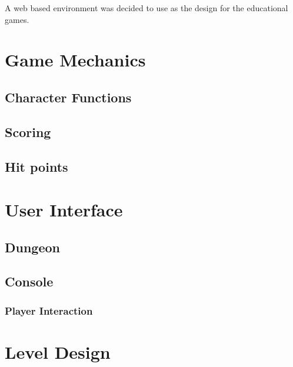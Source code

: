 \documentclass[a4paper,11.5pt]{report}
\numberwithin{figure}{section}
\numberwithin{table}{section}
\numberwithin{equation}{section}
\numberwithin{equation}{section}
\begin{document}

A web based environment was decided to use as the design for the educational games. 


\section{Game Mechanics} %


\subsection{Character Functions}


\subsection{Scoring}

\subsection{Hit points}



\section{User Interface} %

\subsection{Dungeon}

\subsection{Console}

\subsubsection{Player Interaction}


\section{Level Design} %
\end{document}
